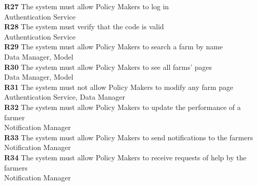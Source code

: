 \textbf{R27} The system must allow Policy Makers to log in\\
\indent Authentication Service\\
\textbf{R28} The system must verify that the code is valid\\
\indent Authentication Service\\
\textbf{R29} The system must allow Policy Makers to search a farm by name\\
\indent Data Manager, Model\\
\textbf{R30} The system must allow Policy Makers to see all farms’ pages\\
\indent Data Manager, Model \\
\textbf{R31} The system must not allow Policy Makers to modify any farm page\\
\indent Authentication Service, Data Manager\\
\textbf{R32} The system must allow Policy Makers to update the performance of a farmer\\
\indent Notification Manager\\
\textbf{R33} The system must allow Policy Makers to send notifications to the farmers\\
\indent Notification Manager\\
\textbf{R34} The system must allow Policy Makers to receive requests of help by the farmers\\
\indent Notification Manager\\